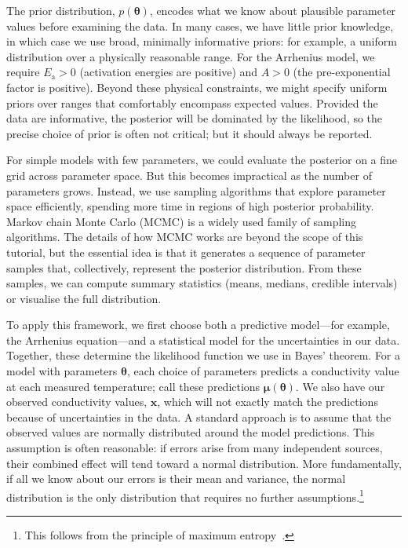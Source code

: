 \documentclass[reprint,superscriptaddress,nobibnotes,nofootinbib,amsmath,amssymb,aps,hidelinks]{revtex4-2}
\newcommand{\Ea}{E_{\mathrm{a}}}
\begin{document}
The prior distribution, $p(\bm{\theta})$, encodes what we know about plausible parameter values before examining the data. 
In many cases, we have little prior knowledge, in which case we use broad, minimally informative priors: for example, a uniform distribution over a physically reasonable range.
For the Arrhenius model, we require $\Ea > 0$ (activation energies are positive) and $A > 0$ (the pre-exponential factor is positive). 
Beyond these physical constraints, we might specify uniform priors over ranges that comfortably encompass expected values. 
Provided the data are informative, the posterior will be dominated by the likelihood, so the precise choice of prior is often not critical; but it should always be reported.

For simple models with few parameters, we could evaluate the posterior on a fine grid across parameter space.
But this becomes impractical as the number of parameters grows. 
Instead, we use sampling algorithms that explore parameter space efficiently, spending more time in regions of high posterior probability.
Markov chain Monte Carlo (MCMC) is a widely used family of sampling algorithms. 
The details of how MCMC works are beyond the scope of this tutorial, but the essential idea is that it generates a sequence of parameter samples that, collectively, represent the posterior distribution. 
From these samples, we can compute summary statistics (means, medians, credible intervals) or visualise the full distribution.

To apply this framework, we first choose both a predictive model---for example, the Arrhenius equation---and a statistical model for the uncertainties in our data.
Together, these determine the likelihood function we use in Bayes' theorem.
For a model with parameters $\bm{\theta}$, each choice of parameters predicts a conductivity value at each measured temperature; call these predictions $\bm{\mu}(\bm{\theta})$.
We also have our observed conductivity values, $\bm{x}$, which will not exactly match the predictions because of uncertainties in the data.
A standard approach is to assume that the observed values are normally distributed around the model predictions. 
This assumption is often reasonable: if errors arise from many independent sources, their combined effect will tend toward a normal distribution. More fundamentally, if all we know about our errors is their mean and variance, the normal distribution is the only distribution that requires no further assumptions.\footnote{This follows from the principle of maximum entropy~\cite{Jaynes_PhysRev1957}.}
\end{document}
